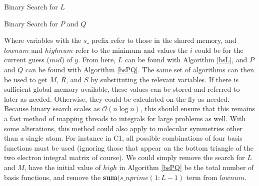 \documentclass[12pt]{book}
\begin{document}
\begin{algorithm}
\caption{Binary Search for $L$}
\label{bsL}
\begin{algorithmic}

		\ENDIF
	\ENDWHILE
\ENDIF

\end{algorithmic}
\end{algorithm}

\begin{algorithm}
\caption{Binary Search for $P$ and $Q$}
\label{bsPQ}
\begin{algorithmic}

		\ENDIF
	\ENDWHILE
\ENDIF

\end{algorithmic}
\end{algorithm}

Where variables with the $s\_$ prefix refer to those in the shared memory, and $lownum$ and $highnum$ refer to the minimum and values the $i$ could be for the current guess ($mid$) of $y$. From here, $L$ can be found with Algorithm \ref{bsL}, and $P$ and $Q$ can be found with Algorithm \ref{bsPQ}. The same set of algorithms can then be used to get $M$, $R$, and $S$ by substituting the relevant variables. If there is sufficient global memory available, these values can be stored and referred to later as needed. Otherwise, they could be calculated on the fly as needed. Because binary search scales as $\mathcal{O}(n\log{}n)$, this should ensure that this remains a fast method of mapping threads to integrals for large problems as well. With some alterations, this method could also apply to molecular symmetries other than a single atom. For instance in C1, all possible combinations of four basis functions must be used (ignoring those that appear on the bottom triangle of the two electron integral matrix of course). We could simply remove the search for $L$ and $M$, have the initial value of $high$ in Algorithm \ref{bsPQ} be the total number of basis functions, and remove the \textbf{sum}$(s\_nprime(1:L-1)$ term from $lownum$. 
\end{document}
